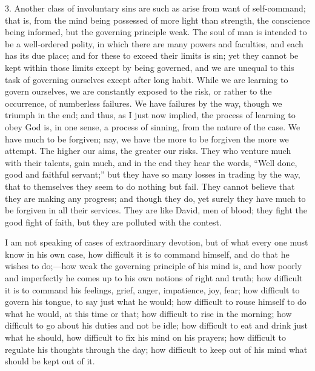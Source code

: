3. Another class of involuntary sins are such as arise from want of
self-command; that is, from the mind being possessed of more light
than strength, the conscience being informed, but the governing
principle weak. The soul of man is intended to be a well-ordered
polity, in which there are many powers and faculties, and each has its
due place; and for these to exceed their limits is sin; yet they
cannot be kept within those limits except by being governed, and we
are unequal to this task of governing ourselves except after long
habit. While we are learning to govern ourselves, we are constantly
exposed to the risk, or rather to the occurrence, of numberless
failures. We have failures by the way, though we triumph in the end;
and thus, as I just now implied, the process of learning to obey God
is, in one sense, a process of sinning, from the nature of the case.
We have much to be forgiven; nay, we have the more to be forgiven the
more we attempt. The higher our aims, the greater our risks. They who
venture much with their talents, gain much, and in the end they hear
the words, ``Well done, good and faithful servant;'' but they
have so many losses in trading by the way, that to themselves they
seem to do nothing but fail. They cannot believe that they are making
any progress; and though they do, yet surely they have much to be
forgiven in all their services. They are like David, men of blood;
they fight the good fight of faith, but they are polluted with the
contest.

I am not speaking of cases of extraordinary devotion, but of what
every one must know in his own case, how difficult it is to command
himself, and do that he wishes to do;—how weak the governing
principle of his mind is, and how poorly and imperfectly he comes up
to his own notions of right and truth; how difficult it is to command
his feelings, grief, anger, impatience, joy, fear; how difficult to
govern his tongue, to say just what he would; how difficult to rouse
himself to do what he would, at this time or that; how difficult to
rise in the morning; how difficult to go about his duties and not be
idle; how difficult to eat and drink just what he should, how
difficult to fix his mind on his prayers; how difficult to regulate
his thoughts through the day; how difficult to keep out of his mind
what should be kept out of it.

